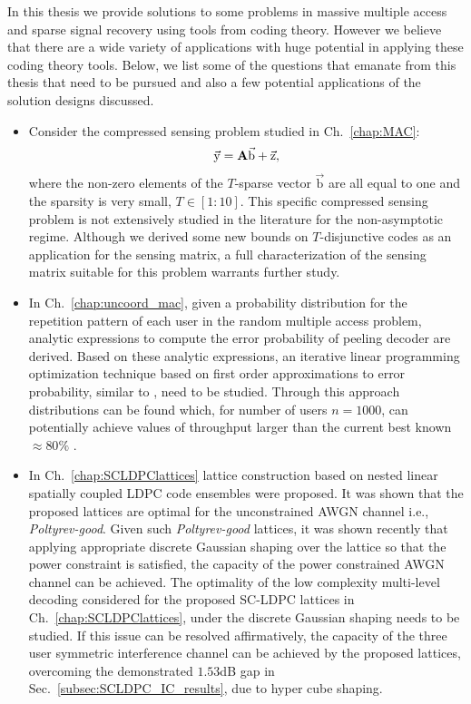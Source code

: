 In this thesis we provide solutions to some problems in massive multiple access and sparse signal recovery using tools from coding theory. However we believe that there are a wide variety of applications with huge potential in applying these coding theory tools. Below, we list some of the questions that emanate from this thesis that need to be pursued and also a few potential applications of the solution designs discussed.

\begin{itemize}
\item Consider the compressed sensing problem studied in Ch.~\ref{chap:MAC}:
\begin{align*}
\vec{\mathrm{y}}=\mathbf{A}\vec{\mathrm{b}}+\vec{\mathrm{z}},
\end{align*}
where the non-zero elements of the $T$-sparse vector $\vec{\mathrm{b}}$ are all equal to one and the sparsity is very small, $T\in[1:10]$. This specific compressed sensing problem is not extensively studied in the literature for the non-asymptotic regime. Although we derived some new bounds on $T$-disjunctive codes as an application for the sensing matrix, a full characterization of the sensing matrix suitable for this problem warrants further study.
\item In Ch.~\ref{chap:uncoord_mac}, given a probability distribution for the repetition pattern of each user in the random multiple access problem, analytic expressions to compute the error probability of peeling decoder are derived. Based on these analytic expressions, an iterative linear programming optimization technique based on first order approximations to error probability, similar to \cite{amraoui2007find}, need to be studied. Through this approach distributions can be found which, for number of users $n=1000$, can potentially achieve values of throughput larger than the current best known $\approx 80\%$ .
\item In Ch.~\ref{chap:SCLDPClattices} lattice construction based on nested linear spatially coupled LDPC code ensembles were proposed. It	 was shown that the proposed lattices are optimal for the unconstrained AWGN channel i.e., \emph{Poltyrev-good}. Given such 
\emph{Poltyrev-good} lattices, it was shown recently \cite{ling2014achieving,yan2014construction} that applying appropriate discrete Gaussian shaping over the lattice so that the power constraint is satisfied, the capacity of the power constrained AWGN channel can be achieved. The optimality of the low complexity multi-level decoding considered for the proposed SC-LDPC lattices in Ch.~\ref{chap:SCLDPClattices}, under the discrete Gaussian shaping needs to be studied. If this issue can be resolved affirmatively, the capacity of the three user symmetric interference channel can be achieved by the proposed lattices, overcoming the demonstrated $1.53$dB gap in Sec.~\ref{subsec:SCLDPC_IC_results}, due to hyper cube shaping.

\end{itemize}
